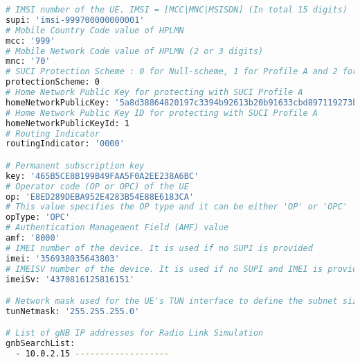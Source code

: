 \begin{lstlisting}[language=sh, caption=UE configuratie]
# IMSI number of the UE. IMSI = [MCC|MNC|MSISDN] (In total 15 digits)
supi: 'imsi-999700000000001'
# Mobile Country Code value of HPLMN
mcc: '999'
# Mobile Network Code value of HPLMN (2 or 3 digits)
mnc: '70'
# SUCI Protection Scheme : 0 for Null-scheme, 1 for Profile A and 2 for Profile B
protectionScheme: 0
# Home Network Public Key for protecting with SUCI Profile A
homeNetworkPublicKey: '5a8d38864820197c3394b92613b20b91633cbd897119273bf8e4a6f4eec0a650'
# Home Network Public Key ID for protecting with SUCI Profile A
homeNetworkPublicKeyId: 1
# Routing Indicator
routingIndicator: '0000'

# Permanent subscription key
key: '465B5CE8B199B49FAA5F0A2EE238A6BC'
# Operator code (OP or OPC) of the UE
op: 'E8ED289DEBA952E4283B54E88E6183CA'
# This value specifies the OP type and it can be either 'OP' or 'OPC'
opType: 'OPC'
# Authentication Management Field (AMF) value
amf: '8000'
# IMEI number of the device. It is used if no SUPI is provided
imei: '356938035643803'
# IMEISV number of the device. It is used if no SUPI and IMEI is provided
imeiSv: '4370816125816151'

# Network mask used for the UE's TUN interface to define the subnet size
tunNetmask: '255.255.255.0'

# List of gNB IP addresses for Radio Link Simulation
gnbSearchList:
  - 10.0.2.15 -------------------
\end{lstlisting}

\subsection{}%
\label{sec:subscriber_config}%






